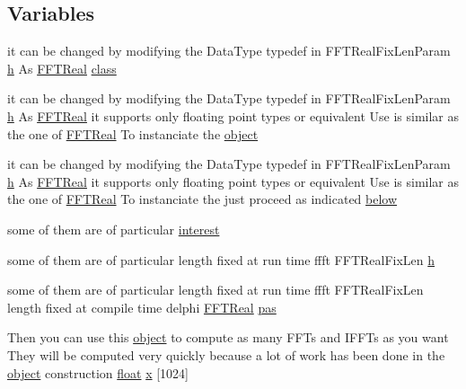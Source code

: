 \subsection*{Variables}
\begin{DoxyCompactItemize}
\item 
it can be changed by modifying the Data\+Type typedef in F\+F\+T\+Real\+Fix\+Len\+Param \hyperlink{FFTReal__readme_8txt_a5a475fe9e77e2d776b063abc32a10e20}{h} As \hyperlink{FFTReal__readme_8txt_afc545541c7ab0be25cf239418fc47b65}{F\+F\+T\+Real} \hyperlink{FFTReal__readme_8txt_ad229ab5c8241df85a2096743cc8c4e9f}{class}
\item 
it can be changed by modifying the Data\+Type typedef in F\+F\+T\+Real\+Fix\+Len\+Param \hyperlink{FFTReal__readme_8txt_a5a475fe9e77e2d776b063abc32a10e20}{h} As \hyperlink{FFTReal__readme_8txt_afc545541c7ab0be25cf239418fc47b65}{F\+F\+T\+Real} it supports only floating point types or equivalent Use is similar as the one of \hyperlink{FFTReal__readme_8txt_afc545541c7ab0be25cf239418fc47b65}{F\+F\+T\+Real} To instanciate the \hyperlink{FFTReal__readme_8txt_a5057f8d0a8b36ba2bdea206a5592c87a}{object}
\item 
it can be changed by modifying the Data\+Type typedef in F\+F\+T\+Real\+Fix\+Len\+Param \hyperlink{FFTReal__readme_8txt_a5a475fe9e77e2d776b063abc32a10e20}{h} As \hyperlink{FFTReal__readme_8txt_afc545541c7ab0be25cf239418fc47b65}{F\+F\+T\+Real} it supports only floating point types or equivalent Use is similar as the one of \hyperlink{FFTReal__readme_8txt_afc545541c7ab0be25cf239418fc47b65}{F\+F\+T\+Real} To instanciate the just proceed as indicated \hyperlink{FFTReal__readme_8txt_aadd6d22385a49baac7311a220729ab52}{below}
\item 
some of them are of particular \hyperlink{FFTReal__readme_8txt_a8dd124b3ee508be769f386edc2b8ccc7}{interest}
\item 
some of them are of particular length fixed at run time ffft F\+F\+T\+Real\+Fix\+Len \hyperlink{FFTReal__readme_8txt_a5a475fe9e77e2d776b063abc32a10e20}{h}
\item 
some of them are of particular length fixed at run time ffft F\+F\+T\+Real\+Fix\+Len length fixed at compile time delphi \hyperlink{FFTReal__readme_8txt_afc545541c7ab0be25cf239418fc47b65}{F\+F\+T\+Real} \hyperlink{FFTReal__readme_8txt_a6cf8b214cfb6bfb689594a776ceb1ea0}{pas}
\item 
Then you can use this \hyperlink{FFTReal__readme_8txt_a5057f8d0a8b36ba2bdea206a5592c87a}{object} to compute as many F\+F\+Ts and I\+F\+F\+Ts as you want They will be computed very quickly because a lot of work has been done in the \hyperlink{FFTReal__readme_8txt_a5057f8d0a8b36ba2bdea206a5592c87a}{object} construction \hyperlink{FFTReal__readme_8txt_a0ea2fae2a8106200bf378b90eae003cf}{float} \hyperlink{FFTReal__readme_8txt_a9c92ac89d1560f812393ca39a19e581e}{x} \mbox{[}1024\mbox{]}

\end{DoxyCompactItemize}
